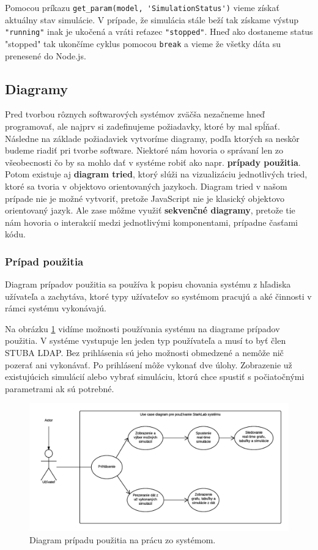 Pomocou príkazu \verb|get_param(model, 'SimulationStatus')| vieme získať aktuálny stav simulácie. V prípade, že simulácia stále beží tak získame výstup \verb|"running"| inak je ukočená a vráti reťazec \verb|"stopped"|. Hneď ako dostaneme status "stopped" tak ukončíme cyklus pomocou \verb|break| a vieme že všetky dáta su prenesené do Node.js.

\subsection{Diagramy}
Pred tvorbou rôznych softwarových systémov zväčša nezačneme hneď programovať, ale najprv si zadefinujeme požiadavky, ktoré by mal spĺňať. Následne na základe požiadaviek vytvoríme diagramy, podľa ktorých sa neskôr budeme riadiť pri tvorbe software. Niektoré nám hovoria o správaní len zo všeobecnosti čo by sa mohlo dať v systéme robiť ako napr. \textbf{prípady použitia}. Potom existuje aj \textbf{diagram tried}, ktorý slúži na vizualizáciu jednotlivých tried, ktoré sa tvoria v objektovo orientovaných jazykoch. Diagram tried v našom prípade nie je možné vytvoriť, pretože JavaScript nie je klasický objektovo orientovaný jazyk. Ale zase môžme využiť \textbf{sekvenčné diagramy}, pretože tie nám hovoria o interakcií medzi jednotlivými komponentami, prípadne časťami kódu.

\subsubsection{Prípad použitia}
Diagram prípadov použitia sa používa k popisu chovania systému z hľadiska užívateľa a zachytáva, ktoré typy užívateľov so systémom pracujú a aké činnosti v rámci systému vykonávajú.\cite{uml-usecase}

Na obrázku \ref{img-use-case} vidíme možnosti používania systému na diagrame prípadov použitia. V systéme vystupuje len jeden typ používateľa a musí to byť člen STUBA LDAP. Bez prihlásenia sú jeho možnosti obmedzené a nemôže nič pozerať ani vykonávať. Po prihlásení môže vykonať dve úlohy. Zobrazenie už existujúcich simulácií alebo vybrať simuláciu, ktorú chce spustiť s počiatočnými parametrami ak sú potrebné.

\begin{figure}[H]
  \centering
  \includegraphics[scale=0.7]{img/diagrams/use-case.png}
  \caption{Diagram prípadu použitia na prácu zo systémom.}
  \label{img-use-case}
\end{figure}


